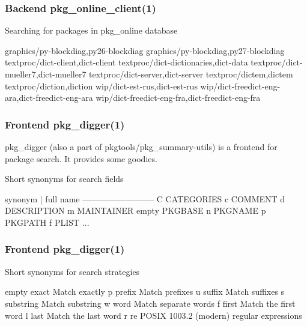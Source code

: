 \documentclass[hyperref=unicode,ascii,xcolor=dvipsnames]{beamer}
\begin{document}

\begin{frame}[fragile]
  \frametitle{Backend pkg\_online\_client(1)}
  \begin{block}{Searching for packages in pkg\_online database}
    \begin{Code}{}
graphics/py-blockdiag,py26-blockdiag
graphics/py-blockdiag,py27-blockdiag
textproc/dict-client,dict-client
textproc/dict-dictionaries,dict-data
textproc/dict-mueller7,dict-mueller7
textproc/dict-server,dict-server
textproc/dictem,dictem
textproc/diction,diction
wip/dict-est-rus,dict-est-rus
wip/dict-freedict-eng-ara,dict-freedict-eng-ara
wip/dict-freedict-eng-fra,dict-freedict-eng-fra
\prompt{#}
    \end{Code}
  \end{block}
\end{frame}


\begin{frame}[fragile]
  \frametitle{Frontend pkg\_digger(1)}
  pkg\_digger (also a part of pkgtools/pkg\_summary-utils) is
  a frontend for package search.
  It provides some goodies.
  \begin{block}{Short synonyms for search fields}
    \begin{Code}{}
synonym | full name
--------------------------
     C   CATEGORIES
     c   COMMENT
     d   DESCRIPTION
     m   MAINTAINER
 empty   PKGBASE
     n   PKGNAME
     p   PKGPATH
     f   PLIST
   ...
    \end{Code}
  \end{block}
\end{frame}


\begin{frame}[fragile]
  \frametitle{Frontend pkg\_digger(1)}
  \begin{block}{Short synonyms for search strategies}
    \begin{Code}{}
 empty     exact   Match exactly
   p       prefix   Match prefixes
   u       suffix   Match suffixes
   s    substring   Match substring
   w         word   Match separate words
   f        first   Match the first word
   l         last   Match the last word
   r           re   POSIX 1003.2 (modern)
                    regular expressions
\prompt{#}
    \end{Code}
  \end{block}
\end{frame}
\end{document}
